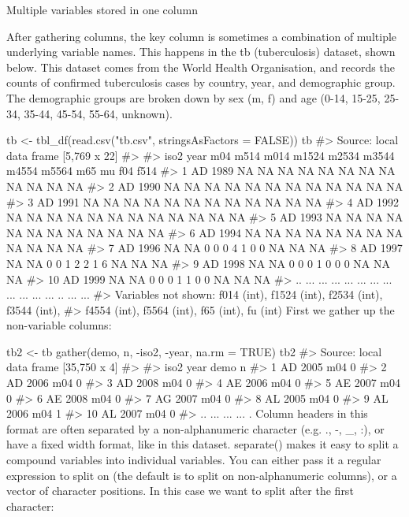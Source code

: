 
Multiple variables stored in one column

After gathering columns, the key column is sometimes a combination of multiple underlying variable names. This happens in the tb (tuberculosis) dataset, shown below. This dataset comes from the World Health Organisation, and records the counts of confirmed tuberculosis cases by country, year, and demographic group. The demographic groups are broken down by sex (m, f) and age (0-14, 15-25, 25-34, 35-44, 45-54, 55-64, unknown).

tb <- tbl_df(read.csv("tb.csv", stringsAsFactors = FALSE))
tb
#> Source: local data frame [5,769 x 22]
#> 
#>    iso2 year m04 m514 m014 m1524 m2534 m3544 m4554 m5564 m65 mu f04 f514
#> 1    AD 1989  NA   NA   NA    NA    NA    NA    NA    NA  NA NA  NA   NA
#> 2    AD 1990  NA   NA   NA    NA    NA    NA    NA    NA  NA NA  NA   NA
#> 3    AD 1991  NA   NA   NA    NA    NA    NA    NA    NA  NA NA  NA   NA
#> 4    AD 1992  NA   NA   NA    NA    NA    NA    NA    NA  NA NA  NA   NA
#> 5    AD 1993  NA   NA   NA    NA    NA    NA    NA    NA  NA NA  NA   NA
#> 6    AD 1994  NA   NA   NA    NA    NA    NA    NA    NA  NA NA  NA   NA
#> 7    AD 1996  NA   NA    0     0     0     4     1     0   0 NA  NA   NA
#> 8    AD 1997  NA   NA    0     0     1     2     2     1   6 NA  NA   NA
#> 9    AD 1998  NA   NA    0     0     0     1     0     0   0 NA  NA   NA
#> 10   AD 1999  NA   NA    0     0     0     1     1     0   0 NA  NA   NA
#> ..  ...  ... ...  ...  ...   ...   ...   ...   ...   ... ... .. ...  ...
#> Variables not shown: f014 (int), f1524 (int), f2534 (int), f3544 (int),
#>   f4554 (int), f5564 (int), f65 (int), fu (int)
First we gather up the non-variable columns:

tb2 <- tb %
  gather(demo, n, -iso2, -year, na.rm = TRUE)
tb2
#> Source: local data frame [35,750 x 4]
#> 
#>    iso2 year demo n
#> 1    AD 2005  m04 0
#> 2    AD 2006  m04 0
#> 3    AD 2008  m04 0
#> 4    AE 2006  m04 0
#> 5    AE 2007  m04 0
#> 6    AE 2008  m04 0
#> 7    AG 2007  m04 0
#> 8    AL 2005  m04 0
#> 9    AL 2006  m04 1
#> 10   AL 2007  m04 0
#> ..  ...  ...  ... .
Column headers in this format are often separated by a non-alphanumeric character (e.g. ., -, _, :), or have a fixed width format, like in this dataset. separate() makes it easy to split a compound variables into individual variables. You can either pass it a regular expression to split on (the default is to split on non-alphanumeric columns), or a vector of character positions. In this case we want to split after the first character:

